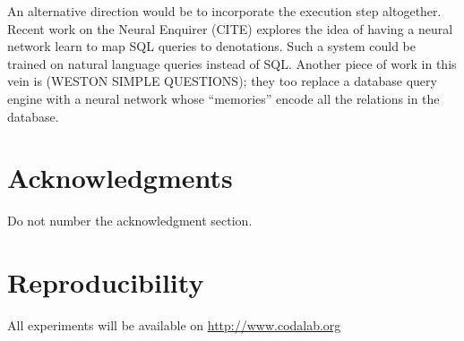\documentclass[11pt,letterpaper]{article}
\begin{document}
An alternative direction would be to incorporate the execution
step altogether.  Recent work on the Neural Enquirer (CITE)
explores the idea of having a neural network learn to map
SQL queries to denotations.  Such a system could be trained
on natural language queries instead of SQL.
Another piece of work in this vein is (WESTON SIMPLE QUESTIONS);
they too replace a database query engine with a neural network
whose ``memories'' encode all the relations in the database.

\section*{Acknowledgments}
Do not number the acknowledgment section.

\section*{Reproducibility}
All experiments will be available on 
\url{http://www.codalab.org}



\end{document}
